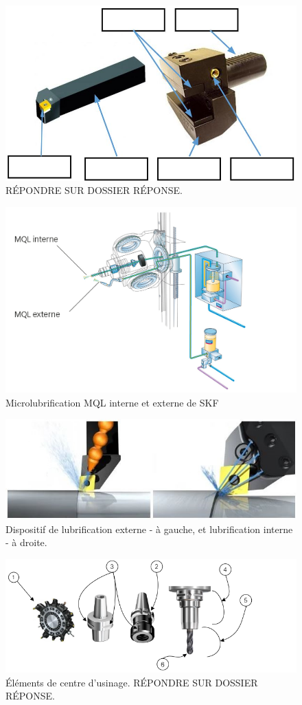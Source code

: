 \documentclass[12pt]{article}
\begin{document}
\begin{figure}
\centering
\includegraphics[width=0.8\linewidth]{Images/PP1.JPG}
\caption{RÉPONDRE SUR DOSSIER RÉPONSE.}
\label{PP1}
\end{figure}


\begin{figure}
\centering
\includegraphics[width=0.9\linewidth]{Images/M1.jpg}
\caption{Microlubrification MQL interne et externe de SKF}
\label{M1}
\end{figure}



\begin{figure}
\centering
\includegraphics[width=0.9\linewidth]{Images/L13.jpg}
\caption{Dispositif de lubrification externe - à gauche, et lubrification interne - à droite.}
\label{L13}
\end{figure}



\begin{figure}
\centering
\includegraphics[width=1\linewidth]{Images/FF1.png}
\caption{Éléments de centre d'usinage. RÉPONDRE SUR DOSSIER RÉPONSE.}
\label{FF1}
\end{figure}
\end{document}

